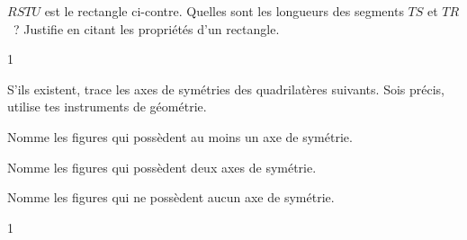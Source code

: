 \documentclass[a4paper,11pt]{report}
\begin{document}
\begin{exo}{
    $RSTU$ est le rectangle ci-contre. Quelles sont les longueurs des segments $TS$ et $TR$~? Justifie en citant les propriétés d'un rectangle.
    \begin{center}
    \end{center}
}{1}
\end{exo}

\newpage

\begin{exop}{
\begin{tasks}
    \task S'ils existent, trace les axes de symétries des quadrilatères suivants. Sois précis, utilise tes instruments de géométrie.
	    \vspace{-0.3cm}
    \begin{center}
        
    \end{center}
    
    \task Nomme les figures qui possèdent au moins un axe de symétrie. 


    \task Nomme les figures qui possèdent deux axes de symétrie.  


    \task Nomme les figures qui ne possèdent aucun axe de symétrie. 

\end{tasks}
    
}{1}
\end{exop}
\end{document}
